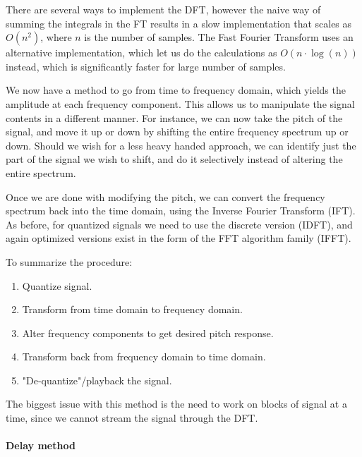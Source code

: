 There are several ways to implement the DFT, however the naive way of summing the integrals in the FT results in a slow implementation that scales as $O(n^{2})$, where $n$ is the number of samples. The Fast Fourier Transform uses an alternative implementation, which let us do the calculations as $O(n \cdot \log(n))$ instead, which is significantly faster for large number of samples. 

We now have a method to go from time to frequency domain, which yields the amplitude at each frequency component. This allows us to manipulate the signal contents in a different manner. For instance, we can now take the pitch of the signal, and move it up or down by shifting the entire frequency spectrum up or down. Should we wish for a less heavy handed approach, we can identify just the part of the signal we wish to shift, and do it selectively instead of altering the entire spectrum.

Once we are done with modifying the pitch, we can convert the frequency spectrum back into the time domain, using the Inverse Fourier Transform (IFT). As before, for quantized signals we need to use the discrete version (IDFT), and again optimized versions exist in the form of the FFT algorithm family (IFFT).

To summarize the procedure:
\begin{enumerate}
	\item Quantize signal.
	\item Transform from time domain to frequency domain.
	\item Alter frequency components to get desired pitch response.
	\item Transform back from frequency domain to time domain.
	\item "De-quantize"/playback the signal.
\end{enumerate}
The biggest issue with this method is the need to work on blocks of signal at a time, since we cannot stream the signal through the DFT.

\paragraph{Delay method}\mbox{}\\
